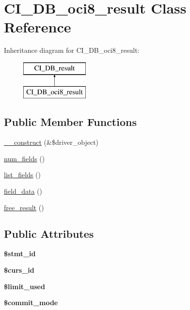 \hypertarget{class_c_i___d_b__oci8__result}{}\section{C\+I\+\_\+\+D\+B\+\_\+oci8\+\_\+result Class Reference}
\label{class_c_i___d_b__oci8__result}
Inheritance diagram for C\+I\+\_\+\+D\+B\+\_\+oci8\+\_\+result\+:\begin{figure}[H]
\begin{center}
\leavevmode
\includegraphics[height=2.000000cm]{class_c_i___d_b__oci8__result}
\end{center}
\end{figure}
\subsection*{Public Member Functions}
\begin{DoxyCompactItemize}
\item 
\mbox{\hyperlink{class_c_i___d_b__oci8__result_a71a63830335b5a984ec717a23810780d}{\+\_\+\+\_\+construct}} (\&\$driver\+\_\+object)
\item 
\mbox{\hyperlink{class_c_i___d_b__oci8__result_a526f909a930e9d74555b518d631ab4f5}{num\+\_\+fields}} ()
\item 
\mbox{\hyperlink{class_c_i___d_b__oci8__result_a28131c06b8fd94b72835395ce225c37a}{list\+\_\+fields}} ()
\item 
\mbox{\hyperlink{class_c_i___d_b__oci8__result_a28b127f026a8f8ba8573d6432c8c41cb}{field\+\_\+data}} ()
\item 
\mbox{\hyperlink{class_c_i___d_b__oci8__result_abfb8b717055f73b37d7a7ed80f862284}{free\+\_\+result}} ()
\end{DoxyCompactItemize}
\subsection*{Public Attributes}
\begin{DoxyCompactItemize}
\item 
\mbox{\label{class_c_i___d_b__oci8__result_a20136f12d4c6cd5671e9b3cebc6b7fde}} 
{\bfseries \$stmt\+\_\+id}
\item 
\mbox{\label{class_c_i___d_b__oci8__result_af3fce35cfdf4544cf26bc9f71a44f937}} 
{\bfseries \$curs\+\_\+id}
\item 
\mbox{\label{class_c_i___d_b__oci8__result_ad4589744fc3f5febaf5a613fe308810d}} 
{\bfseries \$limit\+\_\+used}
\item 
\mbox{\label{class_c_i___d_b__oci8__result_a04340f0dcf35481b52605a48647f08d7}} 
{\bfseries \$commit\+\_\+mode}
\end{DoxyCompactItemize}
